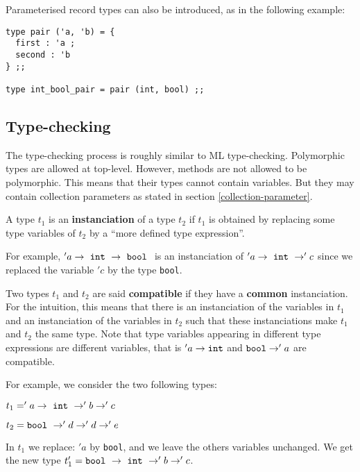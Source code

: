 Parameterised record types can also be introduced, as in the following example:

{\scriptsize
\begin{lstlisting}
type pair ('a, 'b) = {
  first : 'a ;
  second : 'b
} ;;

type int_bool_pair = pair (int, bool) ;;
\end{lstlisting}}

\subsection{Type-checking}
The type-checking process is roughly similar to ML
type-checking. Polymorphic types are allowed at top-level. However,
methods are not allowed to be polymorphic. This means that their types
cannot contain variables. But they may contain collection parameters
as stated in section \ref{collection-parameter}.

A type $t_1$ is an  {\bf instanciation} of a type $t_2$ if $t_1$ is obtained
by replacing some type variables of $t_2$ by a ``more defined type
expression''.

For example, $'a \rightarrow {\tt\ int\ } \rightarrow {\tt\ bool\ }$
is an instanciation of
$'a \rightarrow {\tt\ int\ } \rightarrow 'c$ since we replaced
the variable $'c$ by the type {\tt bool}.

\smallskip
Two types $t_1$ and $t_2$ are said {\bf compatible}
if they have a {\bf common} instanciation. For the intuition, this
means that there is an instanciation of the variables in $t_1$ and
an instanciation of the variables in $t_2$ such that these instanciations
make $t_1$ and $t_2$ the same type. Note that type variables appearing in
different type expressions are different variables, that is
$'a \to {\tt int}$ and ${\tt bool} \to 'a$ are compatible.

For example, we consider the two following types:
\begin{compact-itemize}
  \item $t_1 = 'a \rightarrow {\tt\ int\ } \rightarrow 'b \rightarrow 'c$
  \item $t_2 = {\tt bool\ } \rightarrow 'd \rightarrow 'd \rightarrow 'e$
\end{compact-itemize}

In $t_1$ we replace: $'a$ by {\tt bool}, and we leave the others
variables unchanged. We get the new type
$t'_1 = {\tt bool\ } \rightarrow {\tt\ int\ } \rightarrow 'b \rightarrow 'c$.

